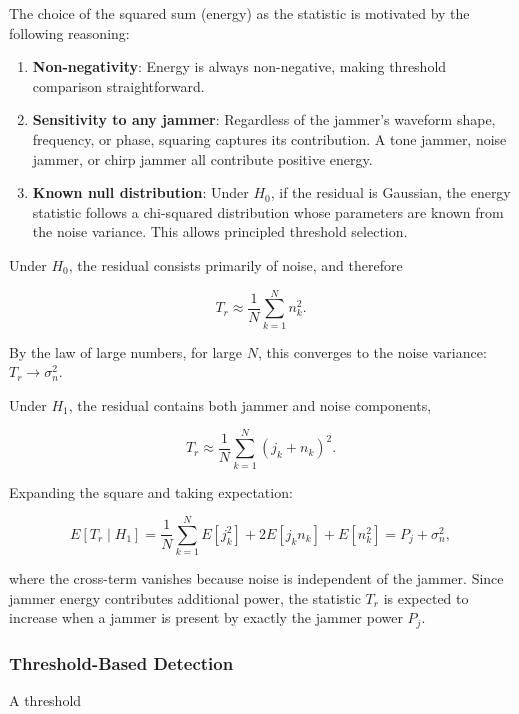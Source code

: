 \documentclass{article}
\begin{document}
The choice of the squared sum (energy) as the statistic is motivated by the following reasoning:

\begin{enumerate}
\item \textbf{Non-negativity}: Energy is always non-negative, making threshold comparison straightforward.
\item \textbf{Sensitivity to any jammer}: Regardless of the jammer's waveform shape, frequency, or phase, squaring captures its contribution. A tone jammer, noise jammer, or chirp jammer all contribute positive energy.
\item \textbf{Known null distribution}: Under $H_0$, if the residual is Gaussian, the energy statistic follows a chi-squared distribution whose parameters are known from the noise variance. This allows principled threshold selection.
\end{enumerate}

Under $H_0$, the residual consists primarily of noise, and therefore

\begin{equation}
T_r \approx
\frac{1}{N}
\sum_{k=1}^{N} n_k^2.
\end{equation}

By the law of large numbers, for large $N$, this converges to the noise variance: $T_r \rightarrow \sigma_n^2$.

Under $H_1$, the residual contains both jammer and noise components,

\begin{equation}
T_r \approx
\frac{1}{N}
\sum_{k=1}^{N} (j_k+n_k)^2.
\end{equation}

Expanding the square and taking expectation:

\begin{equation}
E[T_r \mid H_1] = \frac{1}{N}\sum_{k=1}^N E[j_k^2] + 2E[j_k n_k] + E[n_k^2] = P_j + \sigma_n^2,
\end{equation}

where the cross-term vanishes because noise is independent of the jammer. Since jammer energy contributes additional power, the statistic $T_r$ is expected to increase when a jammer is present by exactly the jammer power $P_j$.

\subsubsection{Threshold-Based Detection}

A threshold
\end{document}
